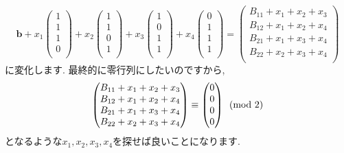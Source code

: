 \documentclass[dvipdfmx,a4paper,11pt]{article}
\theoremstyle{definition}
\begin{document}
$$
\bm{b} + 
x_1\begin{pmatrix}
1 \\
1\\
1\\
0\\
 \end{pmatrix} 
 +
 x_2
  \begin{pmatrix}
1 \\
1\\
0\\
1\\
 \end{pmatrix}
 + 
 x_3
  \begin{pmatrix}
1 \\
0\\
1\\
1\\
 \end{pmatrix}
 +
 x_4
 \begin{pmatrix}
0 \\
1\\
1\\
1\\
 \end{pmatrix}
 = 
 \begin{pmatrix}
B_{11} + x_1+x_2+x_3 \\
B_{12} + x_1+x_2+x_4 \\
B_{21} + x_1+x_3+x_4 \\
B_{22} + x_2+x_3 + x_4\\
 \end{pmatrix}
$$
に変化します. 最終的に零行列にしたいのですから, 
$$
 \begin{pmatrix}
B_{11} + x_1+x_2+x_3 \\
B_{12} + x_1+x_2+x_4 \\
B_{21} + x_1+x_3+x_4 \\
B_{22} + x_2+x_3 + x_4\\
 \end{pmatrix}
 \equiv
\begin{pmatrix}
0 \\
0\\
0\\
0\\
 \end{pmatrix} 
   \text{\,\,\,(mod 2)}
$$
となるような$x_1, x_2, x_3, x_4$を探せば良いことになります.
\end{document}
